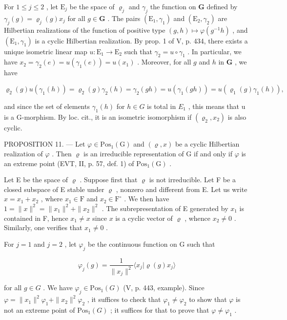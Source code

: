 For \(1 \leqslant j \leqslant 2\) , let \(\mathrm{E}_j\) be the space of \(\varrho_j\) and \(\gamma_j\) the function on \(\mathbf{G}\) defined by \(\gamma_j(g) = \varrho_j(g)x_j\) for all \(g \in \mathbf{G}\) . The pairs \((\mathrm{E}_1, \gamma_1)\) and \((\mathrm{E}_2, \gamma_2)\) are Hilbertian realizations of the function of positive type \((g, h) \mapsto \varphi(g^{-1}h)\) , and \((\mathrm{E}_1, \gamma_1)\) is a cyclic Hilbertian realization. By prop. 1 of V, p. 434, there exists a unique isometric linear map \(u: \mathrm{E}_1 \to \mathrm{E}_2\) such that \(\gamma_2 = u \circ \gamma_1\) . In particular, we have \(x_2 = \gamma_2(e) = u(\gamma_1(e)) = u(x_1)\) . Moreover, for all \(g\) and \(h\) in \(\mathbf{G}\) , we have

\[
\varrho_ {2} (g) u \left(\gamma_ {1} (h)\right) = \varrho_ {2} (g) \gamma_ {2} (h) = \gamma_ {2} (g h) = u \left(\gamma_ {1} (g h)\right) = u \left(\varrho_ {1} (g) \gamma_ {1} (h)\right),
\]

and since the set of elements \(\gamma_{1}(h)\) for \(h \in G\) is total in \(E_{1}\) , this means that u is a G-morphism. By loc. cit., it is an isometric isomorphism if \((\varrho_{2}, x_{2})\) is also cyclic.

PROPOSITION 11. — Let \(\varphi \in \mathrm{Pos}_{1}(\mathrm{G})\) and \((\varrho, x)\) be a cyclic Hilbertian realization of \(\varphi\) . Then \(\varrho\) is an irreducible representation of G if and only if \(\varphi\) is an extreme point (EVT, II, p. 57, def. 1) of \(\mathrm{Pos}_{1}(\mathrm{G})\) .

Let E be the space of \(\varrho\) . Suppose first that \(\varrho\) is not irreducible. Let F be a closed subspace of E stable under \(\varrho\) , nonzero and different from E. Let us write \(x = x_1 + x_2\) , where \(x_1 \in \mathrm{F}\) and \(x_2 \in \mathrm{F}^\circ\) . We then have \(1 = \|x\|^2 = \|x_1\|^2 + \|x_2\|^2\) . The subrepresentation of E generated by \(x_1\) is contained in F, hence \(x_1 \neq x\) since \(x\) is a cyclic vector of \(\varrho\) , whence \(x_2 \neq 0\) . Similarly, one verifies that \(x_1 \neq 0\) .

For \(j = 1\) and \(j = 2\) , let \(\varphi_j\) be the continuous function on G such that

\[
\varphi_ {j} (g) = \frac {1}{\| x _ {j} \| ^ {2}} \langle x _ {j} | \varrho (g) x _ {j} \rangle
\]

for all \(g \in G\) . We have \(\varphi_{j} \in \mathrm{Pos}_{1}(G)\) (V, p. 443, example). Since \(\varphi = \|x_{1}\|^{2}\varphi_{1} + \|x_{2}\|^{2}\varphi_{2}\) , it suffices to check that \(\varphi_{1} \neq \varphi_{2}\) to show that \(\varphi\) is not an extreme point of \(\mathrm{Pos}_{1}(G)\) ; it suffices for that to prove that \(\varphi \neq \varphi_{1}\) .

